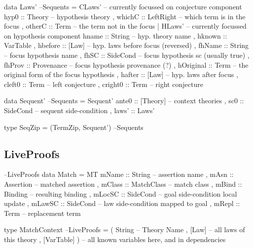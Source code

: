\newpage
\begin{code}
data Laws'                                                          --Sequents
  = CLaws' { -- currently focussed on conjecture component
      hyp0  :: Theory -- hypothesis theory
    , whichC :: LeftRight -- which term is in the focus
    , otherC :: Term  -- the term not in the focus
    }
  | HLaws' { -- currently focussed on hypothesis component
      hname     :: String -- hyp. theory name
    , hknown    :: VarTable
    , hbefore   :: [Law] -- hyp. laws before focus (reversed)
    , fhName    :: String -- focus hypothesis name
    , fhSC      :: SideCond -- focus hypothesis sc (usually true)
    , fhProv    :: Provenance -- focus hypothesis provenance (?)
    , hOriginal :: Term -- the original form of the focus hypothesis
    , hafter    :: [Law] -- hyp. laws after focus
    , cleft0    :: Term -- left conjecture
    , cright0   :: Term -- right conjecture
    }
\end{code}


\begin{code}
data Sequent'                                                       --Sequents
  = Sequent' {
      ante0 :: [Theory] -- context theories
    , sc0       :: SideCond -- sequent side-condition
    , laws'     :: Laws'
    }
\end{code}


\begin{code}
type SeqZip = (TermZip, Sequent')                                   --Sequents
\end{code}

\subsection{LiveProofs}

\begin{code}                                                      --LiveProofs
data Match
 = MT { mName  ::  String     -- assertion name
      , mAsn   ::  Assertion  -- matched assertion
      , mClass ::  MatchClass -- match class
      , mBind  ::  Binding    -- resulting binding
      , mLocSC ::  SideCond   -- goal side-condition local update
      , mLawSC ::  SideCond   -- law side-condition mapped to goal
      , mRepl  ::  Term       -- replacement term
      }
\end{code}

\begin{code}
type MatchContext                                                 --LiveProofs
  = ( String       -- Theory Name
    , [Law]        -- all laws of this theory
    , [VarTable] ) -- all known variables here, and in dependencies
\end{code}

